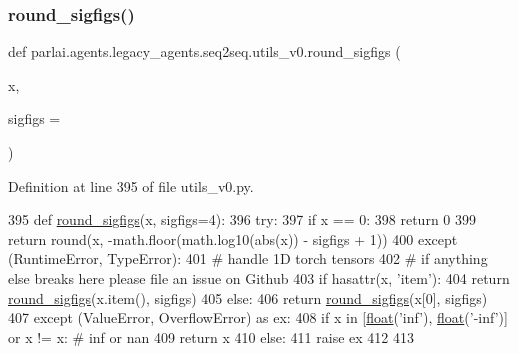 \subsubsection{\texorpdfstring{round\+\_\+sigfigs()}{round\_sigfigs()}}
{\footnotesize\ttfamily def parlai.\+agents.\+legacy\+\_\+agents.\+seq2seq.\+utils\+\_\+v0.\+round\+\_\+sigfigs (\begin{DoxyParamCaption}\item[{}]{x,  }\item[{}]{sigfigs = {} }\end{DoxyParamCaption})}



Definition at line 395 of file utils\+\_\+v0.\+py.


\begin{DoxyCode}
395 \textcolor{keyword}{def }\hyperlink{namespaceparlai_1_1agents_1_1legacy__agents_1_1seq2seq_1_1utils__v0_af377ec61bfc0423461e7b409ffc883b9}{round\_sigfigs}(x, sigfigs=4):
396     \textcolor{keywordflow}{try}:
397         \textcolor{keywordflow}{if} x == 0:
398             \textcolor{keywordflow}{return} 0
399         \textcolor{keywordflow}{return} round(x, -math.floor(math.log10(abs(x)) - sigfigs + 1))
400     \textcolor{keywordflow}{except} (RuntimeError, TypeError):
401         \textcolor{comment}{# handle 1D torch tensors}
402         \textcolor{comment}{# if anything else breaks here please file an issue on Github}
403         \textcolor{keywordflow}{if} hasattr(x, \textcolor{stringliteral}{'item'}):
404             \textcolor{keywordflow}{return} \hyperlink{namespaceparlai_1_1agents_1_1legacy__agents_1_1seq2seq_1_1utils__v0_af377ec61bfc0423461e7b409ffc883b9}{round\_sigfigs}(x.item(), sigfigs)
405         \textcolor{keywordflow}{else}:
406             \textcolor{keywordflow}{return} \hyperlink{namespaceparlai_1_1agents_1_1legacy__agents_1_1seq2seq_1_1utils__v0_af377ec61bfc0423461e7b409ffc883b9}{round\_sigfigs}(x[0], sigfigs)
407     \textcolor{keywordflow}{except} (ValueError, OverflowError) \textcolor{keyword}{as} ex:
408         \textcolor{keywordflow}{if} x \textcolor{keywordflow}{in} [\hyperlink{namespaceprojects_1_1controllable__dialogue_1_1make__control__dataset_aa2b7207688c641dbc094ab44eca27113}{float}(\textcolor{stringliteral}{'inf'}), \hyperlink{namespaceprojects_1_1controllable__dialogue_1_1make__control__dataset_aa2b7207688c641dbc094ab44eca27113}{float}(\textcolor{stringliteral}{'-inf'})] \textcolor{keywordflow}{or} x != x:  \textcolor{comment}{# inf or nan}
409             \textcolor{keywordflow}{return} x
410         \textcolor{keywordflow}{else}:
411             \textcolor{keywordflow}{raise} ex
412 
413 
\end{DoxyCode}
